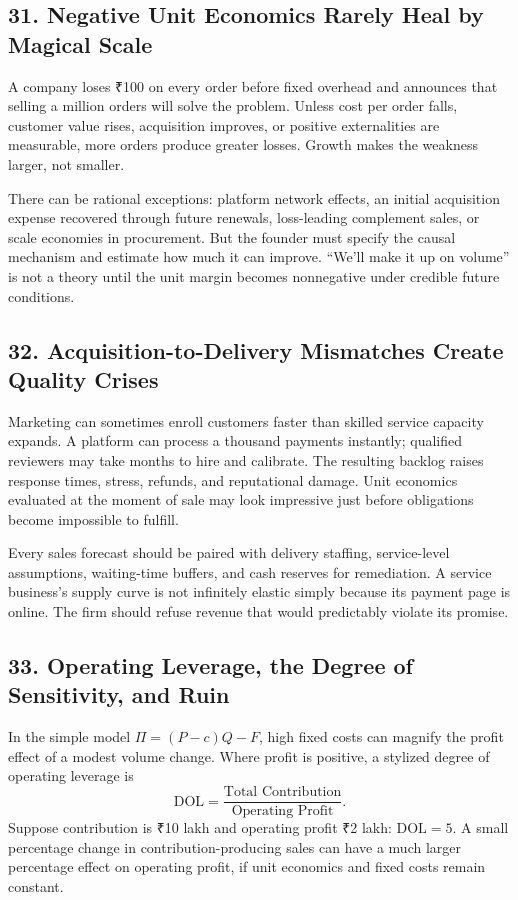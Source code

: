 \subsection*{31. Negative Unit Economics Rarely Heal by Magical Scale}

A company loses ₹100 on every order before fixed overhead and announces that selling a million orders will solve the problem. Unless cost per order falls, customer value rises, acquisition improves, or positive externalities are measurable, more orders produce greater losses. Growth makes the weakness larger, not smaller.

There can be rational exceptions: platform network effects, an initial acquisition expense recovered through future renewals, loss-leading complement sales, or scale economies in procurement. But the founder must specify the causal mechanism and estimate how much it can improve. ``We'll make it up on volume'' is not a theory until the unit margin becomes nonnegative under credible future conditions.

\subsection*{32. Acquisition-to-Delivery Mismatches Create Quality Crises}

Marketing can sometimes enroll customers faster than skilled service capacity expands. A platform can process a thousand payments instantly; qualified reviewers may take months to hire and calibrate. The resulting backlog raises response times, stress, refunds, and reputational damage. Unit economics evaluated at the moment of sale may look impressive just before obligations become impossible to fulfill.

Every sales forecast should be paired with delivery staffing, service-level assumptions, waiting-time buffers, and cash reserves for remediation. A service business's supply curve is not infinitely elastic simply because its payment page is online. The firm should refuse revenue that would predictably violate its promise.

\subsection*{33. Operating Leverage, the Degree of Sensitivity, and Ruin}

In the simple model $\Pi = (P - c)Q - F$, high fixed costs can magnify the profit effect of a modest volume change. Where profit is positive, a stylized degree of operating leverage is
\begin{equation}
\text{DOL} = \frac{\text{Total Contribution}}{\text{Operating Profit}}.
\end{equation}
Suppose contribution is ₹10 lakh and operating profit ₹2 lakh: $\text{DOL} = 5$. A small percentage change in contribution-producing sales can have a much larger percentage effect on operating profit, if unit economics and fixed costs remain constant.

